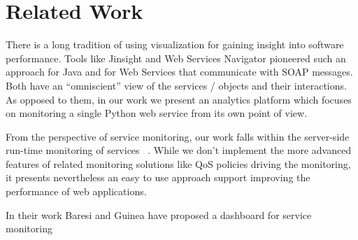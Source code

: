 
\section{Related Work}
\label{sec:related}


There is a long tradition of using visualization for gaining insight into software performance. Tools like Jinsight \cite{Pauw02a} and Web Services Navigator \cite{Pauw05} pioneered such an approach for Java and for Web Services that communicate with SOAP messages. Both have an ``omniscient'' view of the services / objects and their interactions. As opposed to them, in our work we present an analytics platform which focuses on monitoring a single Python web service from its own point of view.

From the perspective of service monitoring, our work falls within the server-side run-time monitoring of services ~\cite{ghezzi2007run}. While we don't implement the more advanced features of related monitoring solutions like QoS policies driving the monitoring, it presents nevertheless an easy to use approach support improving the performance of web applications. 

In their work Baresi and Guinea have proposed a dashboard for service monitoring \cite{Bare13-monitoring}


